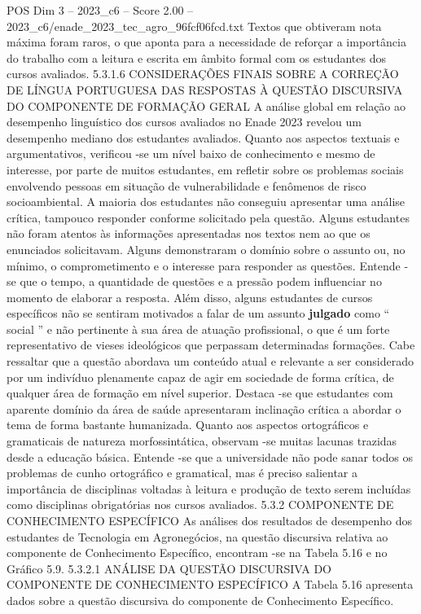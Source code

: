 \begin{textsample}{POS Dim 3 – 2023\_c6 – Score 2.00 – 2023\_c6/enade\_2023\_tec\_agro\_96fcf06fcd.txt}
Textos que obtiveram nota máxima foram raros, o que aponta para a necessidade de reforçar a importância do trabalho com a leitura e escrita em âmbito formal com os estudantes dos cursos avaliados. 5.3.1.6 CONSIDERAÇÕES FINAIS SOBRE A CORREÇÃO DE LÍNGUA PORTUGUESA DAS RESPOSTAS À QUESTÃO DISCURSIVA DO COMPONENTE DE FORMAÇÃO GERAL A análise global em relação ao desempenho linguístico dos cursos avaliados no Enade 2023 revelou um desempenho mediano dos estudantes avaliados.
Quanto aos aspectos textuais e argumentativos, verificou -se um nível baixo de conhecimento e mesmo de interesse, por parte de muitos estudantes, em refletir sobre os problemas sociais envolvendo pessoas em situação de vulnerabilidade e fenômenos de risco socioambiental.
A maioria dos estudantes não conseguiu apresentar uma análise crítica, tampouco responder conforme solicitado pela questão.
Alguns estudantes não foram atentos às informações apresentadas nos textos nem ao que os enunciados solicitavam.
Alguns demonstraram o domínio sobre o assunto ou, no mínimo, o comprometimento e o interesse para responder as questões.
Entende -se que o tempo, a quantidade de questões e a pressão podem influenciar no momento de elaborar a resposta.
Além disso, alguns estudantes de cursos específicos não se sentiram motivados a falar de um assunto \textbf{julgado} como “ social ” e não pertinente à sua área de atuação profissional, o que é um forte representativo de vieses ideológicos que perpassam determinadas formações.
Cabe ressaltar que a questão abordava um conteúdo atual e relevante a ser considerado por um indivíduo plenamente capaz de agir em sociedade de forma crítica, de qualquer área de formação em nível superior.
Destaca -se que estudantes com aparente domínio da área de saúde apresentaram inclinação crítica a abordar o tema de forma bastante humanizada.
Quanto aos aspectos ortográficos e gramaticais de natureza morfossintática, observam -se muitas lacunas trazidas desde a educação básica.
Entende -se que a universidade não pode sanar todos os problemas de cunho ortográfico e gramatical, mas é preciso salientar a importância de disciplinas voltadas à leitura e produção de texto serem incluídas como disciplinas obrigatórias nos cursos avaliados. 5.3.2 COMPONENTE DE CONHECIMENTO ESPECÍFICO As análises dos resultados de desempenho dos estudantes de Tecnologia em Agronegócios, na questão discursiva relativa ao componente de Conhecimento Específico, encontram -se na Tabela 5.16 e no Gráfico 5.9. 5.3.2.1 ANÁLISE DA QUESTÃO DISCURSIVA DO COMPONENTE DE CONHECIMENTO ESPECÍFICO A Tabela 5.16 apresenta dados sobre a questão discursiva do componente de Conhecimento Específico.

\end{textsample}
